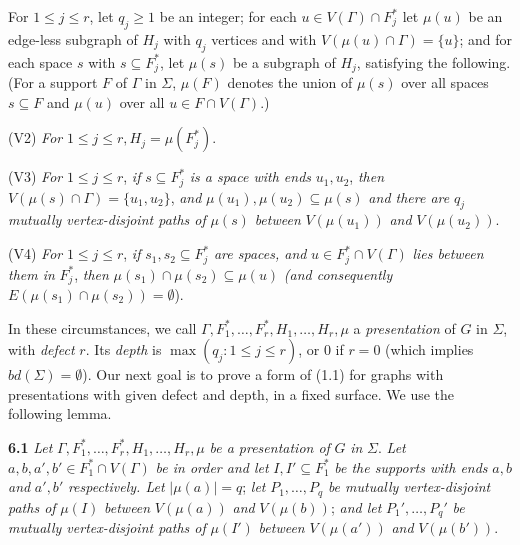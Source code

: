 For $1 \le j \le r$, let $q_j \ge 1$ be an integer; for each $u \in V(\Gamma) \cap F_j^*$ let $\mu(u)$ be an edge-less subgraph of $H_j$ with $q_j$ vertices and with $V(\mu(u) \cap \Gamma) = \{u\}$; and for each space $s$ with $s \subseteq F_j^*$, let $\mu(s)$ be a subgraph of $H_j$, satisfying the following. (For a support $F$ of $\Gamma$ in $\Sigma$, $\mu(F)$ denotes the union of $\mu(s)$ over all spaces $s \subseteq F$ and $\mu(u)$ over all $u \in F \cap V(\Gamma)$.)

\hspace*{12pt}(V2) \textit{For} $1 \le j \le r, H_j = \mu(F_j^*)$.

\hspace*{12pt}(V3) \textit{For} $1 \le j \le r$, \textit{if} $s \subseteq F_j^*$ \textit{is a space with ends} $u_1, u_2$, \textit{then} $V(\mu(s) \cap \Gamma) = \{u_1, u_2\}$, \textit{and} $\mu(u_1), \mu(u_2) \subseteq \mu(s)$ \textit{and there are} $q_j$ \textit{mutually vertex-disjoint paths of} $\mu(s)$ \textit{between} $V(\mu(u_1))$ \textit{and} $V(\mu(u_2))$.

\hspace*{12pt}(V4) \textit{For} $1 \le j \le r$, \textit{if} $s_1, s_2 \subseteq F_j^*$ \textit{are spaces, and} $u \in F_j^* \cap V(\Gamma)$ \textit{lies between them in} $F_j^*$, \textit{then} $\mu(s_1) \cap \mu(s_2) \subseteq \mu(u)$ \textit{(and consequently} $E(\mu(s_1) \cap \mu(s_2)) = \emptyset$).

In these circumstances, we call $\Gamma, F_1^*, \dots, F_r^*, H_1, \dots, H_r, \mu$ a \textit{presentation} of $G$ in $\Sigma$, with \textit{defect} $r$. Its \textit{depth} is $\max(q_j : 1 \le j \le r)$, or $0$ if $r = 0$ (which implies $bd(\Sigma) = \emptyset$). Our next goal is to prove a form of (1.1) for graphs with presentations with given defect and depth, in a fixed surface. We use the following lemma.

\textbf{6.1} \textit{Let} $\Gamma, F_1^*, \dots, F_r^*, H_1, \dots, H_r, \mu$ \textit{be a presentation of} $G$ \textit{in} $\Sigma$. \textit{Let} $a, b, a', b' \in F_1^* \cap V(\Gamma)$ \textit{be in order and let} $I, I' \subseteq F_1^*$ \textit{be the supports with ends} $a, b$ \textit{and} $a', b'$ \textit{respectively. Let} $|\mu(a)| = q$; \textit{let} $P_1, \dots, P_q$ \textit{be mutually vertex-disjoint paths of} $\mu(I)$ \textit{between} $V(\mu(a))$ \textit{and} $V(\mu(b))$; \textit{and let} $P_1', \dots, P_q'$ \textit{be mutually vertex-disjoint paths of} $\mu(I')$ \textit{between} $V(\mu(a'))$ \textit{and} $V(\mu(b'))$.


